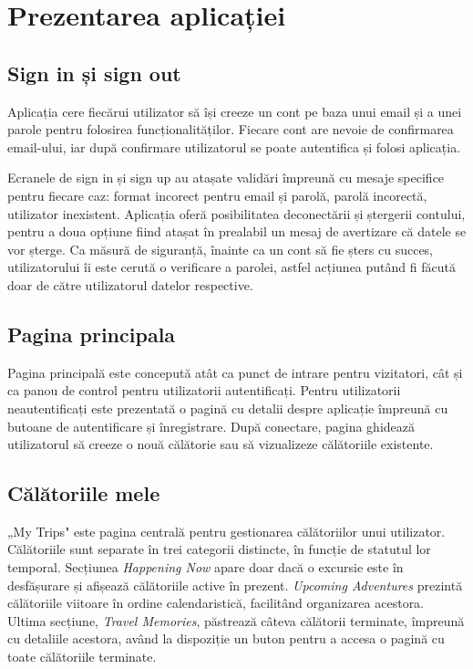 \chapter{Prezentarea aplicației}
\section{Sign in și sign out}
Aplicația cere fiecărui utilizator să își creeze un cont pe baza unui email și a unei parole pentru folosirea funcționalităților. Fiecare cont are nevoie de confirmarea email-ului, iar după confirmare utilizatorul se poate autentifica și folosi aplicația.

Ecranele de sign in și sign up au atașate validări împreună cu mesaje specifice pentru fiecare caz: format incorect pentru email și parolă, parolă incorectă, utilizator inexistent. Aplicația oferă posibilitatea deconectării și ștergerii contului, pentru a doua opțiune fiind atașat în prealabil un mesaj de avertizare că datele se vor șterge. Ca măsură de siguranță, înainte ca un cont să fie șters cu succes, utilizatorului îi este cerută o verificare a parolei, astfel acțiunea putând fi făcută doar de către utilizatorul datelor respective.

\section{Pagina principala}
Pagina principală este concepută atât ca punct de intrare pentru vizitatori, cât și ca panou de control pentru utilizatorii autentificați. Pentru utilizatorii neautentificați este prezentată o pagină cu detalii despre aplicație împreună cu butoane de autentificare și înregistrare. După conectare, pagina ghidează utilizatorul să creeze o nouă călătorie sau să vizualizeze călătoriile existente. 

\section{Călătoriile mele}
„My Trips" este pagina centrală pentru gestionarea călătoriilor unui utilizator. Călătoriile sunt separate în trei categorii distincte, în funcție de statutul lor temporal. Secțiunea \textit{Happening Now} apare doar dacă o excursie este în desfășurare și afișează călătoriile active în prezent. \textit{Upcoming Adventures} prezintă călătoriile viitoare în ordine calendaristică, facilitând organizarea acestora. Ultima secțiune, \textit{Travel Memories}, păstrează câteva călătorii terminate, împreună cu detaliile acestora, având la dispoziție un buton pentru a accesa o pagină cu toate călătoriile terminate.

